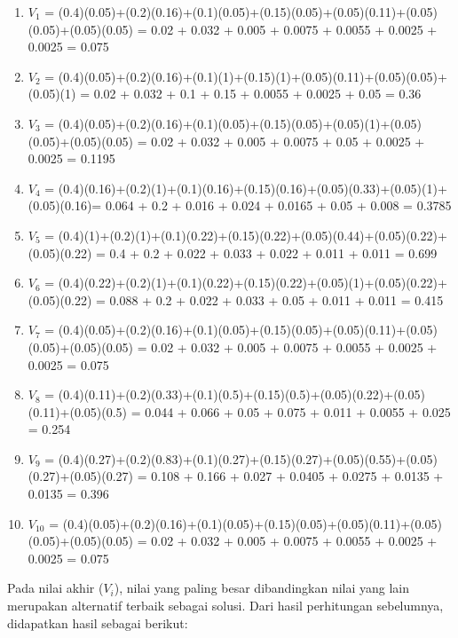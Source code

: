 \begin{enumerate}
	\item $V_{1}$ = (0.4)(0.05)+(0.2)(0.16)+(0.1)(0.05)+(0.15)(0.05)+(0.05)(0.11)+(0.05)(0.05)+(0.05)(0.05) = 0.02 + 0.032 + 0.005 + 0.0075 + 0.0055 + 0.0025 + 0.0025 = 0.075
	
	\item $V_{2}$ = (0.4)(0.05)+(0.2)(0.16)+(0.1)(1)+(0.15)(1)+(0.05)(0.11)+(0.05)(0.05)+(0.05)(1) = 0.02 + 0.032 + 0.1 + 0.15 + 0.0055 + 0.0025 + 0.05 = 0.36
	
	\item $V_{3}$ = (0.4)(0.05)+(0.2)(0.16)+(0.1)(0.05)+(0.15)(0.05)+(0.05)(1)+(0.05)(0.05)+(0.05)(0.05) = 0.02 + 0.032 + 0.005 + 0.0075 + 0.05 + 0.0025 + 0.0025 = 0.1195
	
	\item $V_{4}$ = (0.4)(0.16)+(0.2)(1)+(0.1)(0.16)+(0.15)(0.16)+(0.05)(0.33)+(0.05)(1)+(0.05)(0.16)= 0.064 + 0.2 + 0.016 + 0.024 + 0.0165 + 0.05 + 0.008 = 0.3785
	
	\item $V_{5}$ = (0.4)(1)+(0.2)(1)+(0.1)(0.22)+(0.15)(0.22)+(0.05)(0.44)+(0.05)(0.22)+(0.05)(0.22) = 0.4 + 0.2 + 0.022 + 0.033 + 0.022 + 0.011 + 0.011 = 0.699
	
	\item $V_{6}$ = (0.4)(0.22)+(0.2)(1)+(0.1)(0.22)+(0.15)(0.22)+(0.05)(1)+(0.05)(0.22)+(0.05)(0.22) = 0.088 + 0.2 + 0.022 + 0.033 + 0.05 + 0.011 + 0.011 = 0.415
	
	\item $V_{7}$ = (0.4)(0.05)+(0.2)(0.16)+(0.1)(0.05)+(0.15)(0.05)+(0.05)(0.11)+(0.05)(0.05)+(0.05)(0.05) = 0.02 + 0.032 + 0.005 + 0.0075 + 0.0055 + 0.0025 + 0.0025 = 0.075
	
	\item $V_{8}$ = (0.4)(0.11)+(0.2)(0.33)+(0.1)(0.5)+(0.15)(0.5)+(0.05)(0.22)+(0.05)(0.11)+(0.05)(0.5) = 0.044 + 0.066 + 0.05 + 0.075 + 0.011 + 0.0055 + 0.025 = 0.254
	
	\item $V_{9}$ = (0.4)(0.27)+(0.2)(0.83)+(0.1)(0.27)+(0.15)(0.27)+(0.05)(0.55)+(0.05)(0.27)+(0.05)(0.27) = 0.108 + 0.166 + 0.027 + 0.0405 + 0.0275 + 0.0135 + 0.0135 = 0.396
	
	\item $V_{10}$ = (0.4)(0.05)+(0.2)(0.16)+(0.1)(0.05)+(0.15)(0.05)+(0.05)(0.11)+(0.05)(0.05)+(0.05)(0.05) = 0.02 + 0.032 + 0.005 + 0.0075 + 0.0055 + 0.0025 + 0.0025 = 0.075
\end{enumerate}

Pada nilai akhir ($V_{i}$), nilai yang paling besar dibandingkan nilai yang lain merupakan alternatif terbaik sebagai solusi. Dari hasil perhitungan sebelumnya, didapatkan hasil sebagai berikut:


